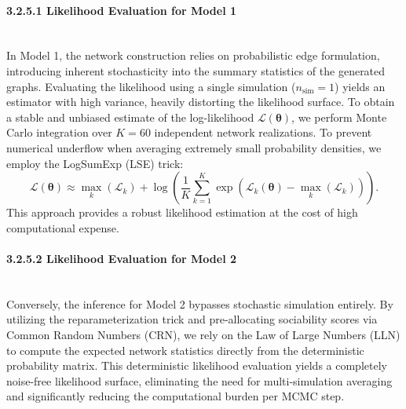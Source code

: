 \paragraph{3.2.5.1 Likelihood Evaluation for Model 1}\mbox{}\\
In Model 1, the network construction relies on probabilistic edge formulation, introducing inherent stochasticity into the summary statistics of the generated graphs. Evaluating the likelihood using a single simulation ($n_{\text{sim}} = 1$) yields an estimator with high variance, heavily distorting the likelihood surface.
To obtain a stable and unbiased estimate of the log-likelihood $\mathcal{L}(\boldsymbol{\theta})$, we perform Monte Carlo integration over $K = 60$ independent network realizations. To prevent numerical underflow when averaging extremely small probability densities, we employ the LogSumExp (LSE) trick:
\begin{equation}
    \mathcal{L}(\boldsymbol{\theta}) \approx \max_k(\mathcal{L}_k) + \log \left( \frac{1}{K} \sum_{k=1}^{K} \exp(\mathcal{L}_k(\boldsymbol{\theta}) - \max_k(\mathcal{L}_k)) \right).
\end{equation}
This approach provides a robust likelihood estimation at the cost of high computational expense.

\paragraph{3.2.5.2 Likelihood Evaluation for Model 2}\mbox{}\\
Conversely, the inference for Model 2 bypasses stochastic simulation entirely. By utilizing the reparameterization trick and pre-allocating sociability scores via Common Random Numbers (CRN), we rely on the Law of Large Numbers (LLN) to compute the expected network statistics directly from the deterministic probability matrix. 
This deterministic likelihood evaluation yields a completely noise-free likelihood surface, eliminating the need for multi-simulation averaging and significantly reducing the computational burden per MCMC step.

